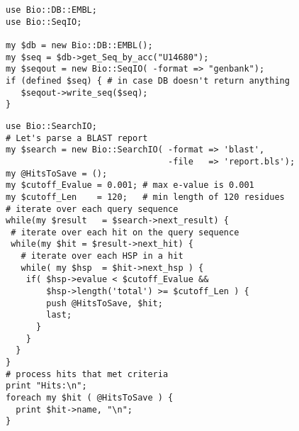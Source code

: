 \documentclass[12pt]{article}
\begin{document}
\newpage

\begin{verbatim}
use Bio::DB::EMBL;
use Bio::SeqIO;

my $db = new Bio::DB::EMBL();
my $seq = $db->get_Seq_by_acc("U14680");
my $seqout = new Bio::SeqIO( -format => "genbank");
if (defined $seq) { # in case DB doesn't return anything
   $seqout->write_seq($seq);
}
\end{verbatim}

\newpage

\begin{verbatim}
use Bio::SearchIO;
# Let's parse a BLAST report 
my $search = new Bio::SearchIO( -format => 'blast',
                                -file   => 'report.bls');
my @HitsToSave = ();
my $cutoff_Evalue = 0.001; # max e-value is 0.001
my $cutoff_Len    = 120;   # min length of 120 residues
# iterate over each query sequence
while(my $result   = $search->next_result) {
 # iterate over each hit on the query sequence
 while(my $hit = $result->next_hit) {
   # iterate over each HSP in a hit
   while( my $hsp  = $hit->next_hsp ) {
    if( $hsp->evalue < $cutoff_Evalue && 
        $hsp->length('total') >= $cutoff_Len ) { 
        push @HitsToSave, $hit;
        last;
      } 
    }
  }
}
# process hits that met criteria
print "Hits:\n";
foreach my $hit ( @HitsToSave ) {
  print $hit->name, "\n";	
}

\end{verbatim}
\end{document}
